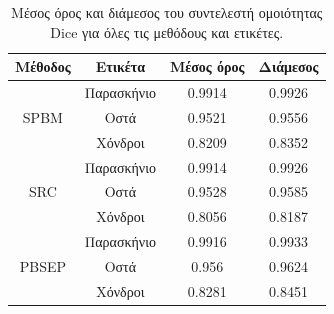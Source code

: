 \documentclass[a4paper,12pt]{article}
\begin{document}
\begin{table}[h!]
    \centering
    \begin{tabular}{|c|c||c|c|} 
        \hline
        Μέθοδος & Ετικέτα & Μέσος όρος & Διάμεσος \\ 
        \hline
        \hline
        \multirow{3}{4em}{SPBM} & Παρασκήνιο & 0.9914 & 0.9926 \\ 
        & Οστά & 0.9521 & 0.9556 \\ 
        & Χόνδροι & 0.8209 & 0.8352 \\ 
        \hline
        \multirow{3}{4em}{SRC} & Παρασκήνιο & 0.9914 & 0.9926 \\ 
        & Οστά & 0.9528 & 0.9585 \\ 
        & Χόνδροι & 0.8056 & 0.8187 \\ 
        \hline
        \multirow{3}{4em}{PBSEP} & Παρασκήνιο & 0.9916 & 0.9933 \\ 
        & Οστά & 0.956 & 0.9624 \\ 
        & Χόνδροι & 0.8281 & 0.8451 \\ 
        \hline
    \end{tabular}
    \caption{Μέσος όρος και διάμεσος του συντελεστή ομοιότητας Dice για όλες
             τις μεθόδους και ετικέτες.}
    \label{table:final_reuslts:1}
\end{table}
\end{document}
